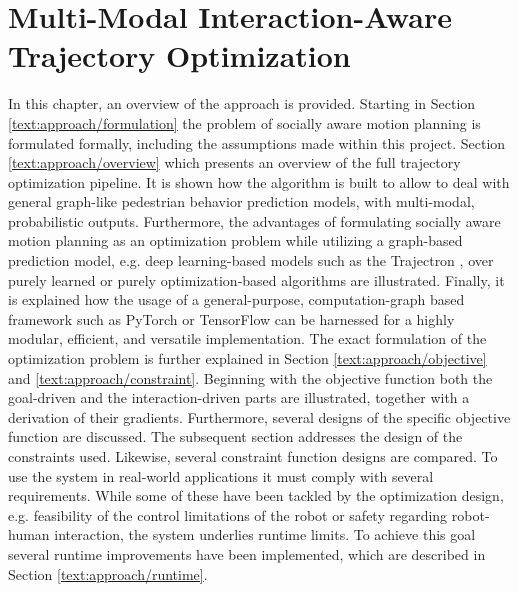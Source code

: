 \chapter{Multi-Modal Interaction-Aware Trajectory Optimization}
\label{text:approach}




In this chapter, an overview of the approach is provided. Starting in Section \ref{text:approach/formulation} the problem of socially aware motion planning is formulated formally, including the assumptions made within this project. 
\newline
Section \ref{text:approach/overview} which presents an overview of the full trajectory optimization pipeline. It is shown how the algorithm is built to allow to deal with general graph-like pedestrian behavior prediction models, with multi-modal, probabilistic outputs. Furthermore, the advantages of formulating socially aware motion planning as an optimization problem while utilizing a graph-based prediction model, e.g. deep learning-based models such as the Trajectron \cite{Ivanovic2018}, over purely learned \cite{Chen2017} or purely optimization-based \cite{Berg2011} algorithms are illustrated. Finally, it is explained how the usage of a general-purpose, computation-graph based framework such as PyTorch \cite{pytorch} or TensorFlow \cite{tensorflow} can be harnessed for a highly modular, efficient, and versatile implementation.
\newline
The exact formulation of the optimization problem is further explained in Section \ref{text:approach/objective} and \ref{text:approach/constraint}. Beginning with the objective function both the goal-driven and the interaction-driven parts are illustrated, together with a derivation of their gradients. Furthermore, several designs of the specific objective function are discussed. The subsequent section addresses the design of the constraints used. Likewise, several constraint function designs are compared. 
\newline
To use the system in real-world applications it must comply with several requirements. While some of these have been tackled by the optimization design, e.g. feasibility of the control limitations of the robot or safety regarding robot-human interaction, the system underlies runtime limits. To achieve this goal several runtime improvements have been implemented, which are described in Section \ref{text:approach/runtime}.




